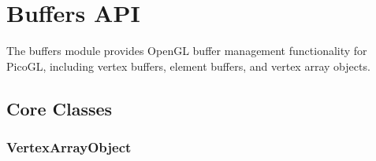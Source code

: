 \documentclass[a4paper,10pt,english,openany,oneside]{sphinxmanual}
\begin{document}
\sphinxstepscope


\section{Buffers API}
\label{\detokenize{api/buffers:buffers-api}}\label{\detokenize{api/buffers::doc}}
\sphinxAtStartPar
The buffers module provides OpenGL buffer management functionality for PicoGL, including vertex buffers, element buffers, and vertex array objects.


\subsection{Core Classes}
\label{\detokenize{api/buffers:core-classes}}

\subsubsection{VertexArrayObject}
\label{\detokenize{api/buffers:vertexarrayobject}}
\end{document}
